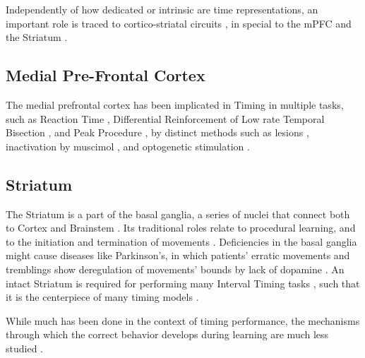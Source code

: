     Independently of how dedicated or intrinsic are time representations, an important role is traced to cortico-striatal circuits \cite{lusk2016utilizing, buhusi2005makes, meck2008cortico}, in special to the mPFC \cite{buhusi2018inactivation} and the Striatum \cite{mello2015scalable}.
        
    \subsection{Medial Pre-Frontal Cortex}
        The medial prefrontal cortex has been implicated in Timing in multiple tasks, such as Reaction Time \cite{narayanan2009delay}, Differential Reinforcement of Low rate \cite{cho2010differential} Temporal Bisection \cite{kim2009inactivation,tiganj2016sequential,kim2013neural}, and Peak Procedure \cite{buhusi2018inactivation}, by distinct methods such as lesions \cite{cho2010differential}, inactivation by muscimol \cite{buhusi2018inactivation, kim2009inactivation}, and optogenetic stimulation \cite{kim2017optogenetic}.
        
        
    \subsection{Striatum}
        The Striatum is a part of the basal ganglia, a series of nuclei that connect both to Cortex and Brainstem \cite{helie2015learning}. 
        Its traditional roles relate to procedural learning, and to the initiation and termination of movements \cite{helie2015learning}. Deficiencies in the basal ganglia might cause diseases like Parkinson's, in which patients' erratic movements and tremblings show deregulation of movements' bounds by lack of dopamine \cite{buhusi2005makes}. An intact Striatum is required for performing many Interval Timing tasks \cite{mello2015scalable,gouvea2015striatal,cho2010differential}, such that it is the centerpiece of many timing models \cite{mello2015scalable, buhusi2005makes}.
    
        While much has been done in the context of timing performance, the mechanisms through which the correct behavior develops during learning are much less studied \cite{van20168}.
